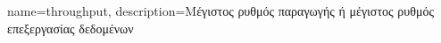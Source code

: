 


{
    name=throughput,
    description={Μέγιστος ρυθμός παραγωγής ή μέγιστος ρυθμός επεξεργασίας δεδομένων}
}
